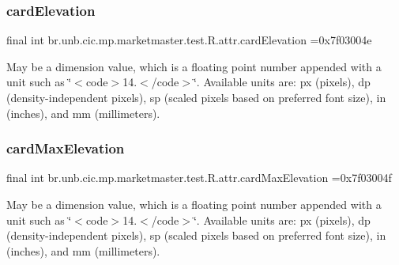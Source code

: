 \subsubsection{\texorpdfstring{card\+Elevation}{cardElevation}}
{\footnotesize\ttfamily final int br.\+unb.\+cic.\+mp.\+marketmaster.\+test.\+R.\+attr.\+card\+Elevation =0x7f03004e\hspace{0.3cm}{\ttfamily [static]}}

May be a dimension value, which is a floating point number appended with a unit such as \char`\"{}$<$code$>$14.\+5sp$<$/code$>$\char`\"{}. Available units are\+: px (pixels), dp (density-\/independent pixels), sp (scaled pixels based on preferred font size), in (inches), and mm (millimeters). \mbox{\label{classbr_1_1unb_1_1cic_1_1mp_1_1marketmaster_1_1test_1_1R_1_1attr_a8bc947cf5c7b3eb1b6f71b5af1f779d8}} 
\subsubsection{\texorpdfstring{card\+Max\+Elevation}{cardMaxElevation}}
{\footnotesize\ttfamily final int br.\+unb.\+cic.\+mp.\+marketmaster.\+test.\+R.\+attr.\+card\+Max\+Elevation =0x7f03004f\hspace{0.3cm}{\ttfamily [static]}}

May be a dimension value, which is a floating point number appended with a unit such as \char`\"{}$<$code$>$14.\+5sp$<$/code$>$\char`\"{}. Available units are\+: px (pixels), dp (density-\/independent pixels), sp (scaled pixels based on preferred font size), in (inches), and mm (millimeters). \mbox{\label{classbr_1_1unb_1_1cic_1_1mp_1_1marketmaster_1_1test_1_1R_1_1attr_a257aa71ec13f12ce3d78ca0fddc56e03}} 
